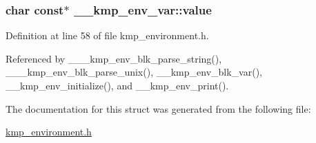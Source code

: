 \hypertarget{struct____kmp__env__var_aab9326e41f54696bffe90343f68780e9}{
\subsubsection[{value}]{\setlength{\rightskip}{0pt plus 5cm}char const$\ast$ \-\_\-\-\_\-kmp\-\_\-env\-\_\-var\-::value}}\label{struct____kmp__env__var_aab9326e41f54696bffe90343f68780e9}


Definition at line 58 of file kmp\-\_\-environment.\-h.



Referenced by \-\_\-\-\_\-\-\_\-kmp\-\_\-env\-\_\-blk\-\_\-parse\-\_\-string(), \-\_\-\-\_\-\-\_\-kmp\-\_\-env\-\_\-blk\-\_\-parse\-\_\-unix(), \-\_\-\-\_\-kmp\-\_\-env\-\_\-blk\-\_\-var(), \-\_\-\-\_\-kmp\-\_\-env\-\_\-initialize(), and \-\_\-\-\_\-kmp\-\_\-env\-\_\-print().



The documentation for this struct was generated from the following file\-:\begin{DoxyCompactItemize}
\item 
\hyperlink{kmp__environment_8h}{kmp\-\_\-environment.\-h}\end{DoxyCompactItemize}
